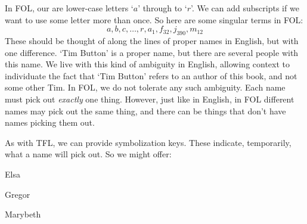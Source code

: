 In FOL, our  are lower-case letters `$a$' through to `$r$'. We can add subscripts if we want to use some letter more than once. So here are some singular terms in FOL:
	$$a,b,c,\ldots, r, a_1, f_{32}, j_{390}, m_{12}$$ These should be
thought of along the lines of proper names in English, but with one
difference. `Tim Button' is a proper name, but there are several
people with this name. We live with this kind of ambiguity in English,
allowing context to individuate the fact that `Tim Button' refers to
an author of this book, and not some other Tim. In FOL, we do not
tolerate any such ambiguity. Each name must pick out \emph{exactly}
one thing. However, just like in English, in FOL different names
may pick out the same thing, and there can be things that don't have
names picking them out.


As with TFL, we can provide symbolization keys. These indicate, temporarily, what a name will pick out. So we might offer:
	\begin{ekey}
		\item[e] Elsa
		\item[g] Gregor
		\item[m] Marybeth
	\end{ekey}


